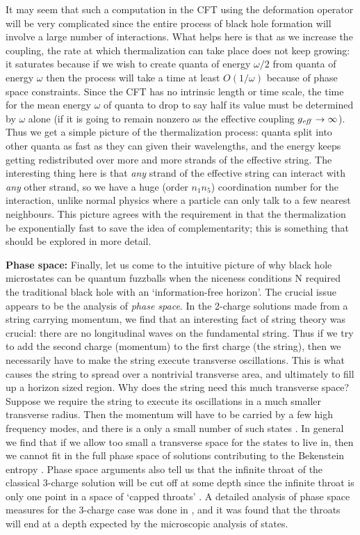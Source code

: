 \documentclass[12pt]{article}
\begin{document}
It may seem that such a computation in the CFT using  the deformation operator will be very complicated since the entire process of black hole formation will involve a large number of interactions. What helps here is that as we increase the coupling, the rate at which thermalization can take place does not keep growing: it saturates because if we wish to create quanta of energy $\omega/2$ from quanta of energy $\omega$ then the process will take a time at least $O(1/\omega)$ because of phase space constraints. Since the CFT has no intrinsic length or time scale,  the time for the mean energy $\omega$ of quanta to drop to say half its value must be determined by $\omega$ alone (if it is going to remain nonzero as the effective coupling $g_{\mathit{eff}}\rightarrow\infty$). Thus we get a simple picture of the thermalization process: quanta split into other quanta as fast as they can given their wavelengths, and the energy keeps getting redistributed over more and more strands of the effective string. The interesting thing here is that {\it any} strand of the effective string can interact with {\it any} other strand, so we have a huge (order $n_1n_5$) coordination number for the interaction, unlike normal physics where a particle can only talk to a few nearest neighbours. This picture agrees with the requirement in \cite{hayden} that the thermalization be exponentially fast to save the idea of complementarity; this is something that should be explored in more detail.


\b

{\bf Phase space:} \quad Finally, let us come to the intuitive picture of why black hole microstates can be quantum fuzzballs when the niceness conditions N required the traditional black hole with an `information-free horizon'. The crucial issue appears to be the analysis of {\it phase space}. In the 2-charge solutions made from a string carrying momentum, we find that an interesting fact of string theory was crucial: there are no longitudinal waves on the fundamental string. Thus if we try to add the second charge (momentum) to the first charge (the string), then we necessarily have to make the string execute transverse oscillations. This is what causes the string to spread over a nontrivial transverse area, and ultimately to fill up a horizon sized region. Why does the string need this much transverse space? Suppose we require the string to execute its oscillations in a much smaller transverse radius. Then the momentum will have to be carried by a few high frequency modes, and there is a only a small number of such states \cite{review}. In general we find that if we allow too small a transverse space for the states to live in, then we cannot fit in the full phase space of solutions contributing to the Bekenstein entropy \cite{phase}.
Phase space arguments also tell us that the infinite throat of the classical 3-charge solution will be cut off at some depth since the infinite throat is only one point in a space of `capped throats' \cite{phase}. A detailed analysis of phase space measures for the 3-charge case was done in \cite{deboer2}, and it was found that the throats will end at a depth expected by the microscopic analysis of states.
\end{document}
